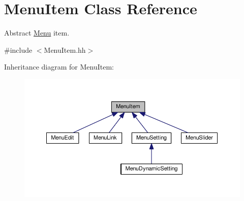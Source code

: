 \hypertarget{classMenuItem}{}\section{Menu\+Item Class Reference}
\label{classMenuItem}


Abstract \hyperlink{classMenu}{Menu} item.  




{\ttfamily \#include $<$Menu\+Item.\+hh$>$}



Inheritance diagram for Menu\+Item\+:
\nopagebreak
\begin{figure}[H]
\begin{center}
\leavevmode
\includegraphics[width=350pt]{classMenuItem__inherit__graph}
\end{center}
\end{figure}
